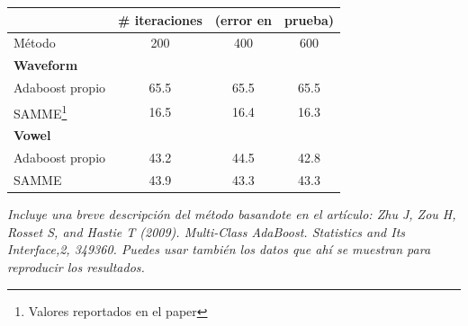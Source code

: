\documentclass[paper=letter, fontsize=11pt]{scrartcl}
\numberwithin{equation}{section} %
\numberwithin{figure}{section} %
\numberwithin{table}{section} %
\begin{document}
\begin{minipage}{\linewidth}
\centering
\begin{tabular}{l|ccc}\hline
 & \# iteraciones & (error en  & prueba)  \\ \hline
Método  & 200 & 400 & 600\\ \hline
\textbf{Waveform} & & & \\
Adaboost propio & 65.5& 65.5 & 65.5\\
SAMME\footnote{Valores reportados en el paper} & 16.5 & 16.4& 16.3\\ \hline
\textbf{Vowel} & & & \\
Adaboost propio & 43.2 & 44.5 & 42.8 \\
SAMME& 43.9 & 43.3& 43.3\\ \hline
\end {tabular}
\label{resultados} 
\end{minipage}
\FloatBarrier 
\[\]
\textit{Incluye una breve descripción del método basandote en el artículo: Zhu J, Zou H, Rosset S, and Hastie T (2009). Multi-Class AdaBoost. Statistics and Its Interface,2, 349360. Puedes
usar también los datos que ahí se muestran para reproducir los resultados.}\\
\end{document}
